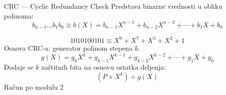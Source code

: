 \begin{frame}[label=06-s023]{CRC — Cyclic Redundancy Check}
\fontsize{10}{12}\selectfont\setlength{\abovedisplayskip}{3pt}\setlength{\belowdisplayskip}{3pt}
Predstava binarne vrednosti u obliku polinoma:
\[b_{n-1}\ldots b_1b_0\equiv b(X)=b_{n-1}X^{n-1}+b_{n-2}X^{n-2}+\cdots+b_1X+b_0\]
{\centering\par}
\[1010100101\equiv X^9+X^7+X^5+X^2+1\]
Osnova CRC-a: generator polinom stepena $k$.
\[g(X)=g_kX^k+g_{k-1}X^{k-1}+g_{k-2}X^{k-2}+\cdots+g_1X+g_0\]
Dodaje se $k$ zaštitnih bita na osnovu ostatka deljenja:
\[\left(P\times X^k\right)\div g(X)\]
\centering\alert{Račun po modulu 2}
\end{frame}
